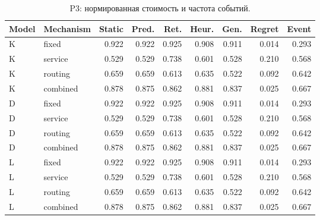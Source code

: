 \begin{table}[htbp]\caption{P3: нормированная стоимость и частота событий.}\centering\small\setlength{\tabcolsep}{3pt}

\begin{tabular}{llrrrrrrr}\toprule

Model & Mechanism & Static & Pred. & Ret. & Heur. & Gen. & Regret & Event\\\midrule

K & fixed & 0.922 & 0.922 & 0.925 & 0.908 & 0.911 & 0.014 & 0.293\\

K & service & 0.529 & 0.529 & 0.738 & 0.601 & 0.528 & 0.210 & 0.568\\

K & routing & 0.659 & 0.659 & 0.613 & 0.635 & 0.522 & 0.092 & 0.642\\

K & combined & 0.878 & 0.875 & 0.862 & 0.881 & 0.837 & 0.025 & 0.667\\

D & fixed & 0.922 & 0.922 & 0.925 & 0.908 & 0.911 & 0.014 & 0.293\\

D & service & 0.529 & 0.529 & 0.738 & 0.601 & 0.528 & 0.210 & 0.568\\

D & routing & 0.659 & 0.659 & 0.613 & 0.635 & 0.522 & 0.092 & 0.642\\

D & combined & 0.878 & 0.875 & 0.862 & 0.881 & 0.837 & 0.025 & 0.667\\

L & fixed & 0.922 & 0.922 & 0.925 & 0.908 & 0.911 & 0.014 & 0.293\\

L & service & 0.529 & 0.529 & 0.738 & 0.601 & 0.528 & 0.210 & 0.568\\

L & routing & 0.659 & 0.659 & 0.613 & 0.635 & 0.522 & 0.092 & 0.642\\

L & combined & 0.878 & 0.875 & 0.862 & 0.881 & 0.837 & 0.025 & 0.667\\

\bottomrule\end{tabular}\end{table}

